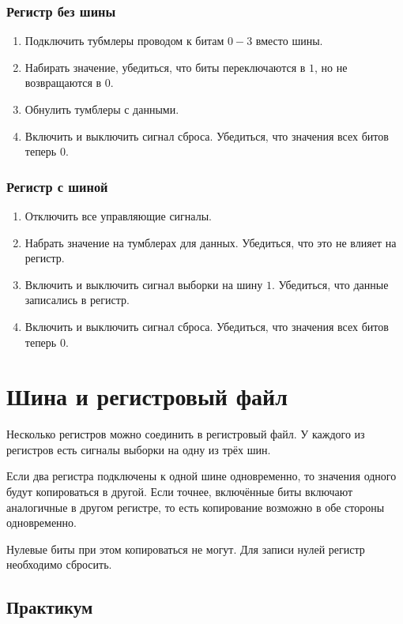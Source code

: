 \documentclass{book}
\begin{document}
\subsubsection{Регистр без шины}

\begin{enumerate}
    \item Подключить тубмлеры проводом к битам $0-3$ вместо шины.
    \item Набирать значение, убедиться, что биты переключаются в $1$, но не возвращаются в $0$.
    \item Обнулить тумблеры с данными.
    \item Включить и выключить сигнал сброса. Убедиться, что значения всех битов теперь $0$.
\end{enumerate}

\subsubsection{Регистр с шиной}

\begin{enumerate}
    \item Отключить все управляющие сигналы.
    \item Набрать значение на тумблерах для данных. Убедиться, что это не влияет на регистр.
    \item Включить и выключить сигнал выборки на шину $1$. Убедиться, что данные записались в регистр.
    \item Включить и выключить сигнал сброса. Убедиться, что значения всех битов теперь $0$.
\end{enumerate}

\section{Шина и регистровый файл}

Несколько регистров можно соединить в регистровый файл.
У каждого из регистров есть сигналы выборки на одну из трёх шин.

Если два регистра подключены к одной шине одновременно,
то значения одного будут копироваться в другой. Если точнее,
включённые биты включают аналогичные в другом регистре, то есть
копирование возможно в обе стороны одновременно.

Нулевые биты при этом копироваться не могут. Для записи нулей
регистр необходимо сбросить.


\subsection{Практикум}
\end{document}
